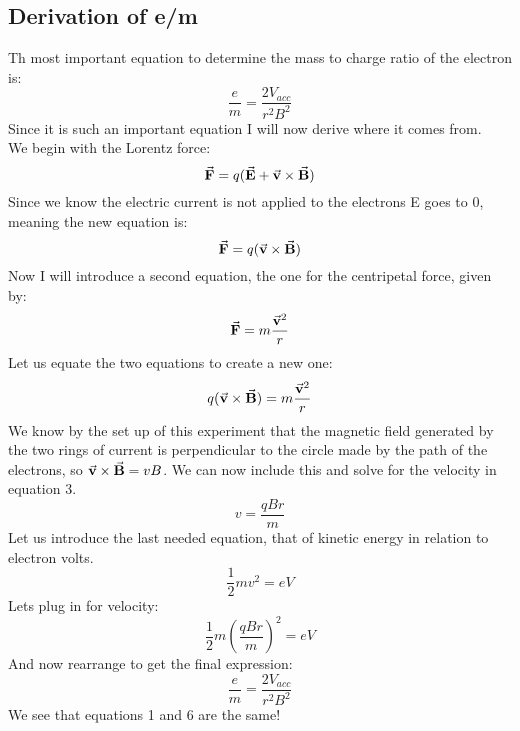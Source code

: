 \documentclass[aps,prl,10pt,twocolumn,floatfix]{revtex4-2}
\begin{document}
\subsection{Derivation of e/m}
Th most important equation to determine the mass to charge ratio of the electron is:
\begin{equation}
\frac{e}{m}=\frac{2V_{acc}}{r^2B^2}
\end{equation}
Since it is such an important equation I will now derive where it comes from. \\
We begin with the Lorentz force:
\begin{equation}
\va{F}=q(\va{E}+\va{v}\times \va{B})
\end{equation}
Since we know the electric current is not applied to the electrons E goes to 0, meaning the new equation is:
\begin{equation*}
\va{F}=q(\va{v}\times \va{B})
\end{equation*}
Now I will introduce a second equation, the one for the centripetal force, given by:
\begin{equation*}
\va{F}=m\frac{\va{v}^2}{r}
\end{equation*}
Let us equate the two equations to create a new one:
\begin{equation}
q(\va{v}\times \va{B})=m\frac{\va{v}^2}{r}
\end{equation}
We know by the set up of this experiment that the magnetic field generated by the two rings of current is perpendicular to the circle made by the path of the electrons, so $\va{v}\times \va{B}=vB$.
We can now include this and solve for the velocity in equation 3.
\begin{equation}
v=\frac{qBr}{m}
\end{equation}
Let us introduce the last needed equation, that of kinetic energy in relation to electron volts.
\begin{equation}
\frac{1}{2}mv^2=eV
\end{equation}
Lets plug in for velocity:
\begin{equation*}
\frac{1}{2}m(\frac{qBr}{m})^2=eV
\end{equation*}
And now rearrange to get the final expression:
\begin{equation}
\frac{e}{m}=\frac{2V_{acc}}{r^2B^2}
\end{equation}
We see that equations 1 and 6 are the same!
\end{document}
